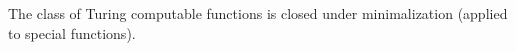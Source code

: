 The class of Turing computable functions is closed under minimalization (applied to special functions).
